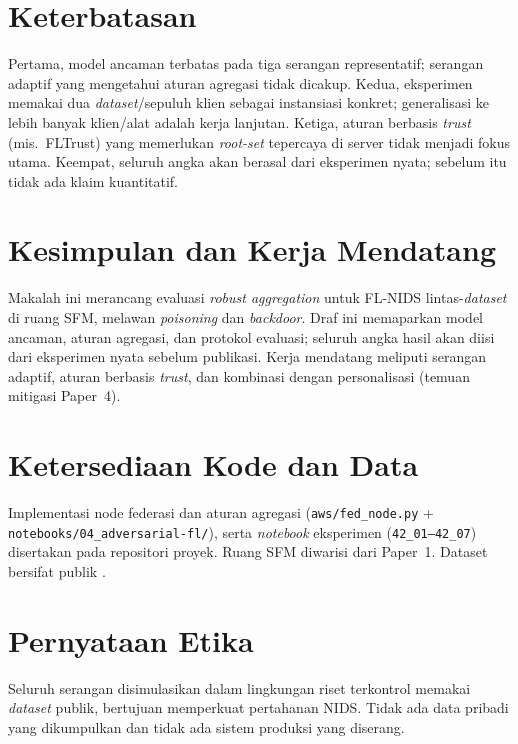 \documentclass[11pt,a4paper]{article}
\begin{document}
\FloatBarrier
\section{Keterbatasan}
\label{sec:limitations}

Pertama, model ancaman terbatas pada tiga serangan representatif; serangan adaptif
yang mengetahui aturan agregasi tidak dicakup. Kedua, eksperimen memakai dua
\emph{dataset}/sepuluh klien sebagai instansiasi konkret; generalisasi ke lebih
banyak klien/alat adalah kerja lanjutan. Ketiga, aturan berbasis \emph{trust}
(mis.\ FLTrust) yang memerlukan \emph{root-set} tepercaya di server tidak menjadi
fokus utama. Keempat, seluruh angka akan berasal dari eksperimen nyata; sebelum itu
tidak ada klaim kuantitatif.

\FloatBarrier
\section{Kesimpulan dan Kerja Mendatang}
\label{sec:conclusion}

Makalah ini merancang evaluasi \emph{robust aggregation} untuk FL-NIDS
lintas-\emph{dataset} di ruang SFM, melawan \emph{poisoning} dan \emph{backdoor}.
Draf ini memaparkan model ancaman, aturan agregasi, dan protokol evaluasi; seluruh
angka hasil akan diisi dari eksperimen nyata sebelum publikasi. Kerja mendatang
meliputi serangan adaptif, aturan berbasis \emph{trust}, dan kombinasi dengan
personalisasi (temuan mitigasi Paper~4).

\section*{Ketersediaan Kode dan Data}
Implementasi node federasi dan aturan agregasi (\texttt{aws/fed\_node.py} +
\texttt{notebooks/04_adversarial-fl/}), serta \emph{notebook} eksperimen (\texttt{42\_01--42\_07})
disertakan pada repositori proyek. Ruang SFM diwarisi dari Paper~1. Dataset bersifat
publik \cite{cicids,unsw}.

\section*{Pernyataan Etika}
Seluruh serangan disimulasikan dalam lingkungan riset terkontrol memakai
\emph{dataset} publik, bertujuan memperkuat pertahanan NIDS. Tidak ada data pribadi
yang dikumpulkan dan tidak ada sistem produksi yang diserang.
\end{document}
